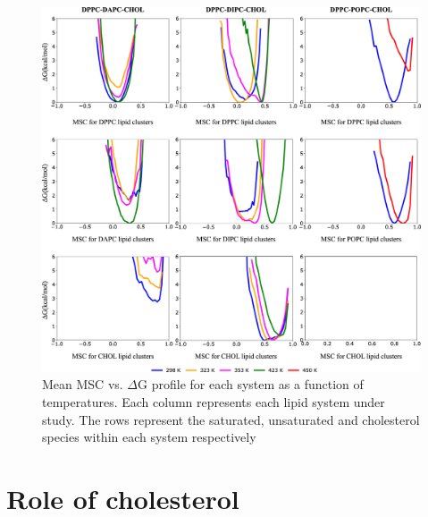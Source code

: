 \documentclass[10pt]{article}
\let\oldsection\section
\renewcommand{\section}{\clearpage\oldsection}
\begin{document}
\begin{figure}[H]
    \centering
    \includegraphics[width=6.5in]{Figures/Supplementary/AVs/MSC/placeholder.jpg}
    \caption{Mean MSC vs. $\Delta$G profile for each system as a function of temperatures. Each column represents each lipid system under study. The rows represent the saturated, unsaturated and cholesterol species within each system respectively}
    \label{figs5:view}
\end{figure}

\section*{Role of cholesterol}
\end{document}
